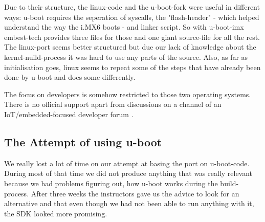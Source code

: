 Due to their structure, the linux-code and the u-boot-fork were useful in 
different ways:
u-boot requires the seperation of syscalls, the "flash-header" - which helped 
understand the way the i.MX6 boots - and linker script.
So with u-boot-imx embest-tech provides three files for those and one giant 
source-file for all the rest.
The linux-port seems better structured but due our lack of knowledge about the
kernel-nuild-process it was hard to use any parts of the source.
Also, as far as initialisation goes, linux seems to repeat some of the steps 
that have already been done by u-boot and does some differently.

The focus on developers is somehow restricted to those two operating systems. 
There is no official support apart from discussions on a channel of an 
IoT/embedded-focused developer forum \cite{forum}.

\subsection{The Attempt of using u-boot}
We really lost a lot of time on our attempt at basing the port on u-boot-code.
During most of that time we did not produce anything that was really relevant 
because we had problems figuring out, how u-boot works during the build-process.
After three weeks the instructors gave us the advice to look for an alternative 
and that even though we had not been able to run anything with it, the SDK 
looked more promising.
